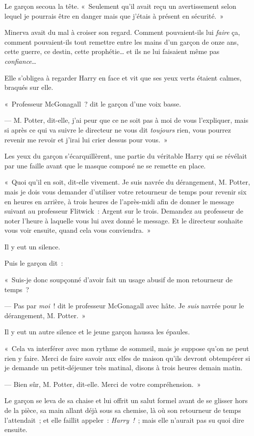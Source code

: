 Le garçon secoua la tête.
«~Seulement qu'il avait reçu un avertissement selon lequel je pourrais être en danger mais que j'étais à présent en sécurité.~»

Minerva avait du mal à croiser son regard.
Comment pouvaient-ils lui \emph{faire} ça, comment pouvaient-ils tout remettre entre les mains d'un garçon de onze ans, cette guerre, ce destin, cette prophétie… et ils ne lui faisaient même pas \emph{confiance}…

Elle s'obligea à regarder Harry en face et vit que ses yeux verts étaient calmes, braqués sur elle.

«~Professeur McGonagall~? dit le garçon d'une voix basse.

--- M. Potter, dit-elle, j'ai peur que ce ne soit pas à moi de vous l'expliquer, mais si après ce qui va suivre le directeur ne vous dit \emph{toujours} rien, vous pourrez revenir me revoir et j'irai lui crier dessus pour vous.~»

Les yeux du garçon s'écarquillèrent, une partie du véritable Harry qui se révélait par une faille avant que le masque composé ne se remette en place.

«~Quoi qu'il en soit, dit-elle vivement.
Je suis navrée du dérangement, M. Potter, mais je dois vous demander d'utiliser votre retourneur de temps pour revenir six en heures en arrière, à trois heures de l'après-midi afin de donner le message suivant au professeur Flitwick~: Argent sur le trois.
Demandez au professeur de noter l'heure à laquelle vous lui avez donné le message.
Et le directeur souhaite vous voir ensuite, quand cela vous conviendra.~»

Il y eut un silence.

Puis le garçon dit~:

«~Suis-je donc soupçonné d'avoir fait un usage abusif de mon retourneur de temps~?

--- Pas par \emph{moi}~! dit le professeur McGonagall avec hâte.
Je \emph{suis} navrée pour le dérangement, M. Potter.~»

Il y eut un autre silence et le jeune garçon haussa les épaules.

«~Cela va interférer avec mon rythme de sommeil, mais je suppose qu'on ne peut rien y faire.
Merci de faire savoir aux elfes de maison qu'ils devront obtempérer si je demande un petit-déjeuner très matinal, disons à trois heures demain matin.

--- Bien sûr, M. Potter, dit-elle.
Merci de votre compréhension.~»

Le garçon se leva de sa chaise et lui offrit un salut formel avant de se glisser hors de la pièce, sa main allant déjà sous sa chemise, là où son retourneur de temps l'attendait~; et elle faillit appeler~: \emph{Harry~!}~; mais elle n'aurait pas su quoi dire ensuite.

